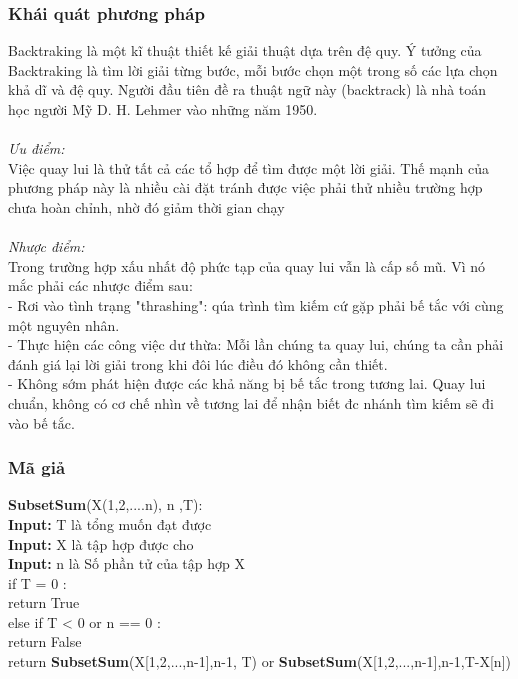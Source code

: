 \documentclass[a4paper]{article}
\newcommand\tab[1][1cm]{\hspace*{#1}}
\begin{document}
\subsubsection{Khái quát phương pháp}
Backtraking là một kĩ thuật thiết kế giải thuật dựa trên đệ quy. Ý tưởng của
Backtraking là tìm lời giải từng bước, mỗi bước chọn một trong số các lựa chọn
khả dĩ và đệ quy. Người đầu tiên đề ra thuật ngữ này (backtrack) là nhà toán học
người Mỹ D. H. Lehmer vào những năm 1950.\\ \\
\textit{Ưu điểm: }\\
Việc quay lui là thử tất cả các tổ hợp để tìm được một lời giải. Thế mạnh của
phương pháp này là nhiều cài đặt tránh được việc phải thử nhiều trường hợp chưa
hoàn chỉnh, nhờ đó giảm thời gian chạy\\ \\
\textit{Nhược điểm:}\\
Trong trường hợp xấu nhất độ phức tạp của quay lui vẫn là cấp số mũ. Vì nó mắc
phải các nhược điểm sau:\\
\tab - Rơi vào tình trạng "thrashing": qúa trình tìm kiếm cứ gặp phải bế tắc với
cùng một nguyên nhân.\\
\tab - Thực hiện các công việc dư thừa: Mỗi lần chúng ta quay lui, chúng ta cần
phải đánh giá lại lời giải trong khi đôi lúc điều đó không cần thiết.\\
\tab - Không sớm phát hiện được các khả năng bị bế tắc trong tương lai. Quay lui
chuẩn, không có cơ chế nhìn về tương lai để nhận biết đc nhánh tìm kiếm sẽ đi vào
bế tắc.
\subsubsection{Mã giả}
\newpage
\begin{framed}
\textbf{SubsetSum}(X(1,2,....n), n ,T):\\
\tab \textbf{Input:} T là tổng muốn đạt được\\
\tab \textbf{Input:} X là tập hợp được cho \\
\tab \textbf{Input:} n là Số phần tử của tập hợp X\\
\tab if T = 0 : \\
\tab\tab return True \\
\tab else if T < 0 or n == 0 :\\
\tab\tab return False\\
\tab return \textbf{SubsetSum}(X[1,2,...,n-1],n-1, T) or \textbf{SubsetSum}(X[1,2,...,n-1],n-1,T-X[n])
\end{framed}
\end{document}
